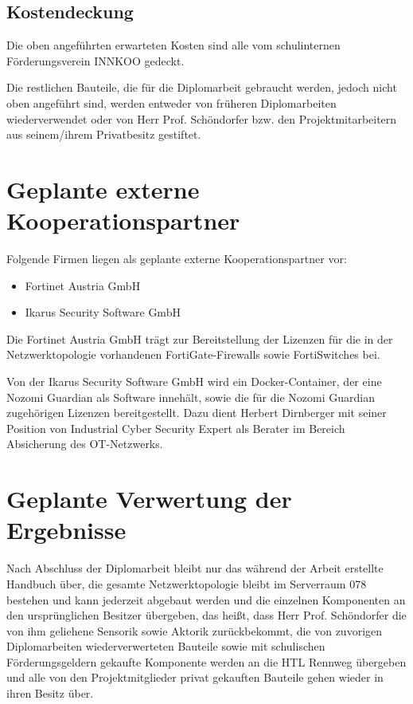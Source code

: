 \documentclass[
	headings=optiontotocandhead,%
	oneside,
	numbers=noenddot,%
	toc=flat, %
	10pt, %
	parskip=full, %
	listof=totoc, %
	listof=flat, %
	numbers=noenddot, %
	bibliography=totoc, %
	a4paper,DIV=14,
]{scrartcl}
\begin{document}
\subsection{Kostendeckung}
Die oben angeführten erwarteten Kosten sind alle vom schulinternen Förderungsverein INNKOO gedeckt.

Die restlichen Bauteile, die für die Diplomarbeit gebraucht werden, jedoch nicht oben angeführt sind, werden entweder von früheren Diplomarbeiten wiederverwendet oder von Herr Prof. Schöndorfer bzw. den Projektmitarbeitern aus seinem/ihrem Privatbesitz gestiftet.

\newpage
\section{Geplante externe Kooperationspartner}
Folgende Firmen liegen als geplante externe Kooperationspartner vor:
\begin{itemize}
	\item{Fortinet Austria GmbH}
	\item{Ikarus Security Software GmbH}
\end{itemize}
Die Fortinet Austria GmbH trägt zur Bereitstellung der Lizenzen für die in der Netzwerktopologie vorhandenen FortiGate-Firewalls sowie FortiSwitches bei.

Von der Ikarus Security Software GmbH wird ein Docker-Container, der eine Nozomi Guardian als Software innehält, sowie die für die Nozomi Guardian zugehörigen Lizenzen bereitgestellt. Dazu dient Herbert Dirnberger mit seiner Position von Industrial Cyber Security Expert als Berater im Bereich Absicherung des OT-Netzwerks.

\newpage
\section{Geplante Verwertung der Ergebnisse}
Nach Abschluss der Diplomarbeit bleibt nur das während der Arbeit erstellte Handbuch über, die gesamte Netzwerktopologie bleibt im Serverraum 078 bestehen und kann jederzeit abgebaut werden und die einzelnen Komponenten an den ursprünglichen Besitzer übergeben, das heißt, dass Herr Prof. Schöndorfer die von ihm geliehene Sensorik sowie Aktorik zurückbekommt, die von zuvorigen Diplomarbeiten wiederverwerteten Bauteile sowie mit schulischen Förderungsgeldern gekaufte Komponente werden an die HTL Rennweg übergeben und alle von den Projektmitglieder privat gekauften Bauteile gehen wieder in ihren Besitz über. 
\end{document}
